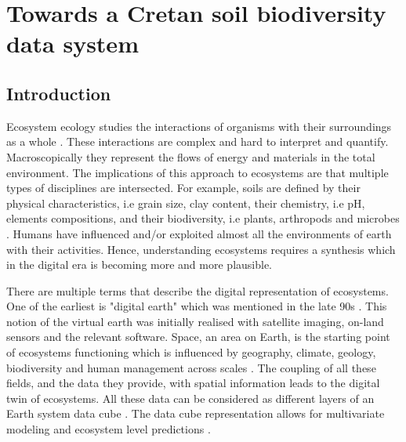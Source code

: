 % 
% 


\chapter{Towards a Cretan soil biodiversity data system}
\label{cha:crete-idea}

\section{Introduction}\label{intro_idea}

Ecosystem ecology studies the interactions of organisms with their surroundings
as a whole \parencite{van-dyne1966ecosystems}. These interactions are complex and hard to interpret and quantify.
Macroscopically they represent the flows of energy and materials in the total environment.
The implications of this approach to ecosystems are that multiple types of disciplines 
are intersected. For example, soils are defined by their physical characteristics,
i.e grain size, clay content, their chemistry, i.e pH, elements compositions, and 
their biodiversity, i.e plants, arthropods and microbes \parencite{vogel2022}. Humans have influenced 
and/or exploited almost all the environments of earth with their activities.
Hence, understanding ecosystems requires a synthesis which in the digital era 
is becoming more and more plausible. 

There are multiple terms that describe the digital representation of ecosystems.
One of the earliest is "digital earth" which was mentioned in the late 90s \parencite{Goodchild_2012}.
This notion of the virtual earth was initially realised with satellite imaging,
on-land sensors and the relevant software. Space, an area on Earth, is
the starting point of ecosystems functioning which is influenced by geography,
climate, geology, biodiversity and human management across scales \parencite{Zarnetske2019_towards}. The coupling of all these
fields, and the data they provide, with spatial information leads to the
digital twin of ecosystems. All these data can be considered as different layers
of an Earth system data cube \parencite{mahecha2020earth}. The data cube representation
allows for multivariate modeling and ecosystem level predictions \parencite{mahecha2020earth}.

